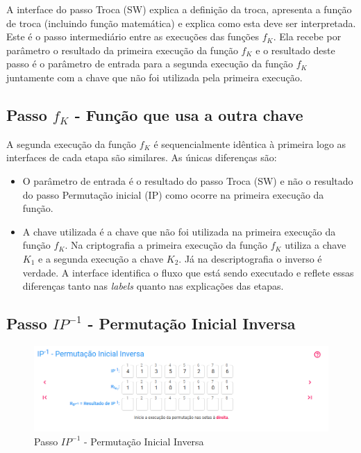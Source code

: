 A interface do passo Troca (SW) explica a definição da troca, apresenta a função de troca (incluindo função matemática) e explica como esta deve ser interpretada. Este é o passo intermediário entre as execuções das funções \(f_K\). Ela recebe por parâmetro o resultado da primeira execução da função \(f_K\) e o resultado deste passo é o parâmetro de entrada para a segunda execução da função \(f_K\) juntamente com a chave que não foi utilizada pela primeira execução.

\subsection{Passo \(f_K\) - Função que usa a outra chave}

A segunda execução da função \(f_K\) é sequencialmente idêntica à primeira logo as interfaces de cada etapa são similares. As únicas diferenças são:
\begin{itemize}
    \item O parâmetro de entrada é o resultado do passo Troca (SW) e não o resultado do passo Permutação inicial (IP) como ocorre na primeira execução da função.
    \item A chave utilizada é a chave que não foi utilizada na primeira execução da função \(f_K\). Na criptografia a primeira execução da função \(f_K\) utiliza a chave \(K_1\) e a segunda execução a chave \(K_2\). Já na descriptografia o inverso é verdade. A interface identifica o fluxo que está sendo executado e reflete essas diferenças tanto nas \textit{labels} quanto nas explicações das etapas.
\end{itemize}

\subsection{Passo \(IP^{-1}\) - Permutação Inicial Inversa}

\begin{figure}[H]
    \centering
    \caption{Passo \(IP^{-1}\) - Permutação Inicial Inversa}
    \includegraphics[width=1\linewidth]{UI/UIIP-1.png}
\end{figure}

